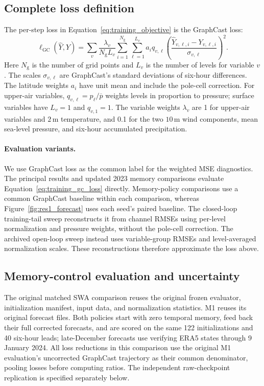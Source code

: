\documentclass{article}
\newcommand{\vfourchange}[1]{{\color{blue}#1}}
\begin{document}
\subsection{Complete loss definition}
\label{app:training_loss}
The per-step loss in Equation~\ref{eq:training_objective} is the {GraphCast loss}:
\begin{equation}
    \ell_{\mathrm{GC}}(\hat{Y},Y)
    =\sum_v\frac{\lambda_v}{N_{\mathrm{g}}L_v}
      \sum_{i=1}^{N_{\mathrm{g}}}\sum_{\ell=1}^{L_v}
      a_i q_{v,\ell}
      \left(\frac{\hat{Y}_{v,\ell,i}-Y_{v,\ell,i}}
      {\sigma_{v,\ell}}\right)^2.
    \label{eq:training_gc_loss}
\end{equation}
Here $N_{\mathrm{g}}$ is the number of grid points and $L_v$ is the number of levels for variable $v$. The scales $\sigma_{v,\ell}$ are GraphCast's standard deviations of six-hour differences. The latitude weights $a_i$ have unit mean and include the pole-cell correction. For upper-air variables, $q_{v,\ell}=p_\ell/\overline{p}$ weights levels in proportion to pressure; surface variables have $L_v=1$ and $q_{v,1}=1$. The variable weights $\lambda_v$ are 1 for upper-air variables and $2$\,m temperature, and 0.1 for the two $10$\,m wind components, mean sea-level pressure, and six-hour accumulated precipitation.

\paragraph{{Evaluation variants.}}
We use GraphCast loss as the common label for the weighted MSE diagnostics. The principal results \vfourchange{and updated 2023 memory comparisons} evaluate Equation~\ref{eq:training_gc_loss} directly. \vfourchange{Memory-policy comparisons use a common GraphCast baseline within each comparison, whereas Figure~\ref{fig:res1_forecast} uses each seed's paired baseline.} The closed-loop training-tail sweep \vfourchange{reconstructs} it from channel RMSEs using per-level normalization and pressure weights, without the pole-cell correction. The archived open-loop sweep instead uses variable-group RMSEs and level-averaged normalization scales. These reconstructions therefore approximate the loss above.

\subsection{\vfourchange{Memory-control evaluation and uncertainty}}
\label{app:memory_evaluation}

\vfourchange{The original matched SWA comparison reuses the original frozen evaluator, initialization manifest, input data, and normalization statistics. M1 reuses its original forecast files. Both policies start with zero temporal memory, feed back their full corrected forecasts, and are scored on the same 122 initializations and 40 six-hour leads; late-December forecasts use verifying ERA5 states through 9 January 2024. All loss reductions in this comparison use the original M1 evaluation's uncorrected GraphCast trajectory as their common denominator, pooling losses before computing ratios. The independent raw-checkpoint replication is specified separately below.}
\end{document}

